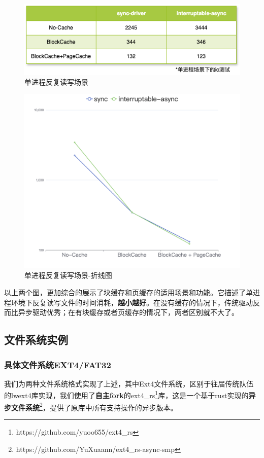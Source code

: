 \documentclass{article}
\begin{document}
\begin{figure}[H]
    \centering
    \includegraphics[width=0.7\linewidth]{assets//fs/perf-single-file.png}
    \caption{单进程反复读写场景}
\end{figure}\begin{figure}[H]
    \centering
    \includegraphics[width=0.7\linewidth]{assets//fs/perf-single-file-line.png}
    \caption{单进程反复读写场景-折线图}
\end{figure}

以上两个图，更加综合的展示了块缓存和页缓存的适用场景和功能。它描述了单进程环境下反复读写文件的时间消耗，\textbf{越小越好}。在没有缓存的情况下，传统驱动反而比异步驱动优秀；在有块缓存或者页缓存的情况下，两者区别就不大了。

\subsection{文件系统实例}
\subsubsection{具体文件系统EXT4/FAT32}
我们为两种文件系统格式实现了上述，其中Ext4文件系统，区别于往届传统队伍的lwext4库实现，我们使用了\textbf{自主fork}的ext4\_rs\footnote{https://github.com/yuoo655/ext4\_rs}库，这是一个基于rust实现的\textbf{异步文件系统}\footnote{https://github.com/YuXuaann/ext4\_rs-async-smp}，提供了原库中所有支持操作的异步版本。
\end{document}
